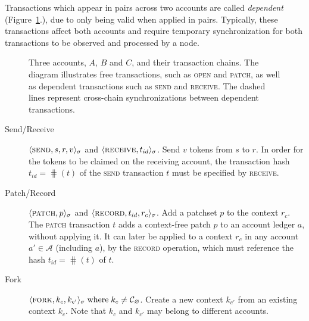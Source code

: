 Transactions which appear in pairs across two accounts are called
\emph{dependent} (Figure~\ref{tx-dependencies}.), due to only being valid when
applied in pairs. Typically, these transactions affect both accounts and
require temporary synchronization for both transactions to be observed and
processed by a node.

\begin{figure}[hbp]
    
    \caption{Three accounts, $A$, $B$ and $C$, and their transaction chains.
        The diagram illustrates free transactions, such as \textsc{open} and
        \textsc{patch}, as well as dependent transactions such as \textsc{send}
        and \textsc{receive}.  The dashed lines represent cross-chain
        synchronizations between dependent transactions.
    \label{tx-dependencies}}
\end{figure}

\begin{description}
    \item[Send/Receive] $\langle \text{\normalfont\scshape send}, s, r, v \rangle_{\sigma}$ and
        $\langle \text{\normalfont\scshape receive}, t_{id} \rangle_{\sigma}$. Send $v$ tokens from $s$ to $r$. In
        order for the tokens to be claimed on the receiving account, the
        transaction hash $t_{id} = \hash(t)$ of the \textsc{send} transaction
        $t$ must be specified by \textsc{receive}.
    \item[Patch/Record] $\langle \text{\normalfont\scshape patch}, p \rangle_\sigma$ and $\langle \text{\normalfont\scshape record}, t_{id},
        r_c \rangle_{\sigma}$.  Add a patchset $p$ to the context $r_c$. The
        \textsc{patch} transaction $t$ adds a context-free patch $p$ to an
        account ledger $a$, without applying it. It can later be applied to a
        context $r_c$ in any account $a' \in \mathcal{A}$ (including $a$), by
        the \textsc{record} operation, which must reference the hash $t_{id} =
        \hash(t)$ of $t$.
    \item[Fork] $\langle \text{\normalfont\scshape fork}, k_c, k_{c'} \rangle_\sigma \; \text{where} \; k_c \neq
        \mathcal{C}_{\varnothing}$. Create a new context $k_{c'}$ from an
        existing context $k_c$. Note that $k_c$ and $k_{c'}$ may belong to
        different accounts.
\end{description}
